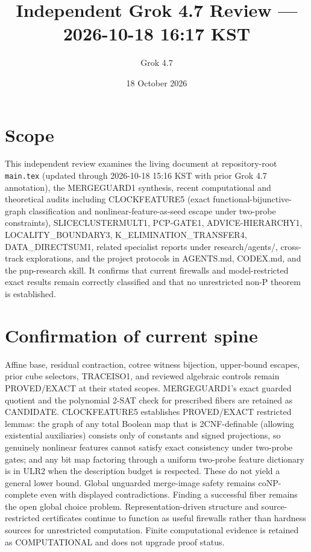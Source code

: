 \documentclass[11pt]{article}
\title{Independent Grok 4.7 Review --- 2026-10-18 16:17 KST}
\author{Grok 4.7}
\date{18 October 2026}
\begin{document}
\maketitle

\begin{center}
\end{center}

\section{Scope}
This independent review examines the living document at repository-root \texttt{main.tex} (updated through 2026-10-18 15:16 KST with prior Grok 4.7 annotation), the MERGEGUARD1 synthesis, recent computational and theoretical audits including CLOCKFEATURE5 (exact functional-bijunctive-graph classification and nonlinear-feature-as-seed escape under two-probe constraints), SLICECLUSTERMULT1, PCP-GATE1, ADVICE-HIERARCHY1, LOCALITY_BOUNDARY3, K_ELIMINATION_TRANSFER4, DATA_DIRECTSUM1, related specialist reports under research/agents/, cross-track explorations, and the project protocols in AGENTS.md, CODEX.md, and the pnp-research skill. It confirms that current firewalls and model-restricted exact results remain correctly classified and that no unrestricted non-P theorem is established.

\section{Confirmation of current spine}
Affine base, residual contraction, cotree witness bijection, upper-bound escapes, prior cube selectors, TRACEISO1, and reviewed algebraic controls remain PROVED/EXACT at their stated scopes. MERGEGUARD1's exact guarded quotient and the polynomial 2-SAT check for prescribed fibers are retained as CANDIDATE. CLOCKFEATURE5 establishes PROVED/EXACT restricted lemmas: the graph of any total Boolean map that is 2CNF-definable (allowing existential auxiliaries) consists only of constants and signed projections, so genuinely nonlinear features cannot satisfy exact consistency under two-probe gates; and any bit map factoring through a uniform two-probe feature dictionary is in ULR2 when the description budget is respected. These do not yield a general lower bound. Global unguarded merge-image safety remains coNP-complete even with displayed contradictions. Finding a successful fiber remains the open global choice problem. Representation-driven structure and source-restricted certificates continue to function as useful firewalls rather than hardness sources for unrestricted computation. Finite computational evidence is retained as COMPUTATIONAL and does not upgrade proof status.
\end{document}
